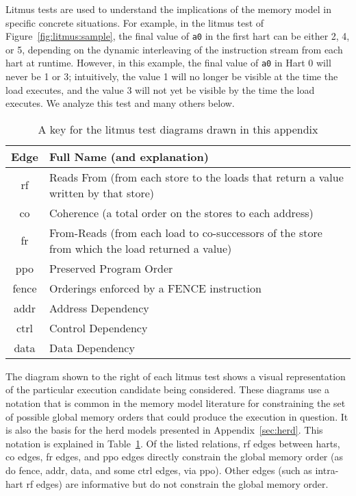 Litmus tests are used to understand the implications of the memory model in specific concrete situations.
For example, in the litmus test of Figure~\ref{fig:litmus:sample}, the final value of {\tt a0} in the first hart can be either 2, 4, or 5, depending on the dynamic interleaving of the instruction stream from each hart at runtime.
However, in this example, the final value of {\tt a0} in Hart 0 will never be 1 or 3; intuitively, the value 1 will no longer be visible at the time the load executes, and the value 3 will not yet be visible by the time the load executes.
We analyze this test and many others below.

\begin{table}[h]
  \centering\small
  \begin{tabular}{|c|l|}
    \hline
    Edge & Full Name (and explanation) \\
    \hline
    \sf rf   & Reads From (from each store to the loads that return a value written by that store) \\
    \hline
    \sf co   & Coherence (a total order on the stores to each address) \\
    \hline
    \sf fr   & From-Reads (from each load to co-successors of the store from which the load returned a value) \\
    \hline
    \sf ppo  & Preserved Program Order \\
    \hline
    \sf fence & Orderings enforced by a FENCE instruction \\
    \hline
    \sf addr & Address Dependency \\
    \hline
    \sf ctrl & Control Dependency \\
    \hline
    \sf data & Data Dependency \\
    \hline
  \end{tabular}
  \caption{A key for the litmus test diagrams drawn in this appendix}
  \label{tab:litmus:key}
\end{table}

The diagram shown to the right of each litmus test shows a visual representation of the particular execution candidate being considered.
These diagrams use a notation that is common in the memory model literature for constraining the set of possible global memory orders that could produce the execution in question.
It is also the basis for the \textsf{herd} models presented in Appendix~\ref{sec:herd}.
This notation is explained in Table~\ref{tab:litmus:key}.
Of the listed relations, {\sf rf} edges between harts, {\sf co} edges, {\sf fr} edges, and {\sf ppo} edges directly constrain the global memory order (as do {\sf fence}, {\sf addr}, {\sf data}, and some {\sf ctrl} edges, via {\sf ppo}).
Other edges (such as intra-hart {\sf rf} edges) are informative but do not constrain the global memory order.


